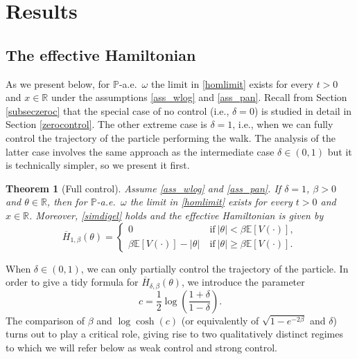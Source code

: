 \documentclass[a4paper]{amsart}
\numberwithin{equation}{section}
\theoremstyle{plain}
\newtheorem{theorem}{\sc Theorem}[section]
\theoremstyle{remark}
\begin{document}
\section{Results}\label{buyukressec}

\subsection{The effective Hamiltonian}\label{bankerbilo}

As we present below, for $\mathbb{P}$-a.e.\ $\omega$ the limit in \eqref{homlimit} exists for every $t>0$ and $x\in\mathbb{R}$ under the assumptions \eqref{ass_wlog} and \eqref{ass_pan}. Recall from Section \ref{subseczeroc} that the special case of no control (i.e., $\delta = 0$) is studied in detail in Section \ref{zerocontrol}. 
The other extreme case is $\delta =1$, i.e., when we can fully control the trajectory of the particle performing the walk. The analysis of the latter case involves the same approach as the intermediate case $\delta\in(0,1)$ but it is technically simpler, so we present it first.

\begin{theorem}[Full control]\label{thmfull}
Assume \eqref{ass_wlog} and \eqref{ass_pan}. If $\delta = 1$, $\beta > 0$ and $\theta\in\mathbb{R}$, then for $\mathbb{P}$-a.e.\ $\omega$ the limit in \eqref{homlimit} exists for every $t>0$ and $x\in\mathbb{R}$. Moreover, \eqref{simdigel} holds and the effective Hamiltonian is given by
\begin{equation}\label{fulllimit}
\overline H_{1,\beta}(\theta) = \begin{cases}
0&\ \text{if}\ |\theta| < \beta\mathbb{E}[V(\cdot)],\\
\beta\mathbb{E}[V(\cdot)] - |\theta|&\ \text{if}\ |\theta| \ge \beta\mathbb{E}[V(\cdot)].
\end{cases}
\end{equation}
\end{theorem}

When $\delta\in(0,1)$, we can only partially control the trajectory of the particle.
In order to give a tidy formula for $\overline H_{\delta,\beta}(\theta)$, we introduce the parameter
\begin{equation}\label{parasi}
c = \frac1{2}\log\left(\frac{1 + \delta}{1 - \delta}\right). 
\end{equation}
The comparison of $\beta$ and $\log\cosh(c)$ 
(or equivalently of $\sqrt{1 - e^{-2\beta}}$ and $\delta$) turns out to play a critical role, giving rise to two qualitatively distinct regimes to which we will refer below as weak control and strong control.
\end{document}

